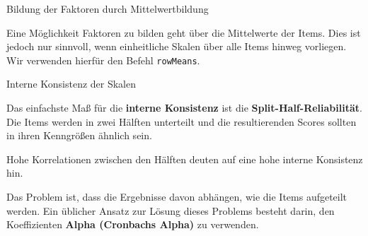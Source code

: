 \documentclass[12pt,ngerman,a4paper,ignorenonframetext,]{beamer}
\newenvironment{Shaded}{\begin{snugshade}}{\end{snugshade}}
\newcommand{\DataTypeTok}[1]{\textcolor[rgb]{0.13,0.29,0.53}{#1}}
\newcommand{\KeywordTok}[1]{\textcolor[rgb]{0.13,0.29,0.53}{\textbf{#1}}}
\newcommand{\NormalTok}[1]{#1}
\newcommand{\OperatorTok}[1]{\textcolor[rgb]{0.81,0.36,0.00}{\textbf{#1}}}
\newcommand{\OtherTok}[1]{\textcolor[rgb]{0.56,0.35,0.01}{#1}}
\newcommand{\StringTok}[1]{\textcolor[rgb]{0.31,0.60,0.02}{#1}}
\begin{document}
\begin{frame}{Bildung der Faktoren durch
Mittelwertbildung}
\protect\hypertarget{bildung-der-faktoren-durch-mittelwertbildung}{}

Eine Möglichkeit Faktoren zu bilden geht über die Mittelwerte der Items.
Dies ist jedoch nur sinnvoll, wenn einheitliche Skalen über alle Items
hinweg vorliegen. Wir verwenden hierfür den Befehl \texttt{rowMeans}.

\begin{Shaded}
\end{Shaded}

\end{frame}

\begin{frame}{Interne Konsistenz der Skalen}
\protect\hypertarget{interne-konsistenz-der-skalen}{}

Das einfachste Maß für die \textbf{interne Konsistenz} ist die
\textbf{Split-Half-Reliabilität}. Die Items werden in zwei Hälften
unterteilt und die resultierenden Scores sollten in ihren Kenngrößen
ähnlich sein.

Hohe Korrelationen zwischen den Hälften deuten auf eine hohe interne
Konsistenz hin.

Das Problem ist, dass die Ergebnisse davon abhängen, wie die Items
aufgeteilt werden. Ein üblicher Ansatz zur Lösung dieses Problems
besteht darin, den Koeffizienten \textbf{Alpha (Cronbachs Alpha)} zu
verwenden.

\end{frame}
\end{document}
